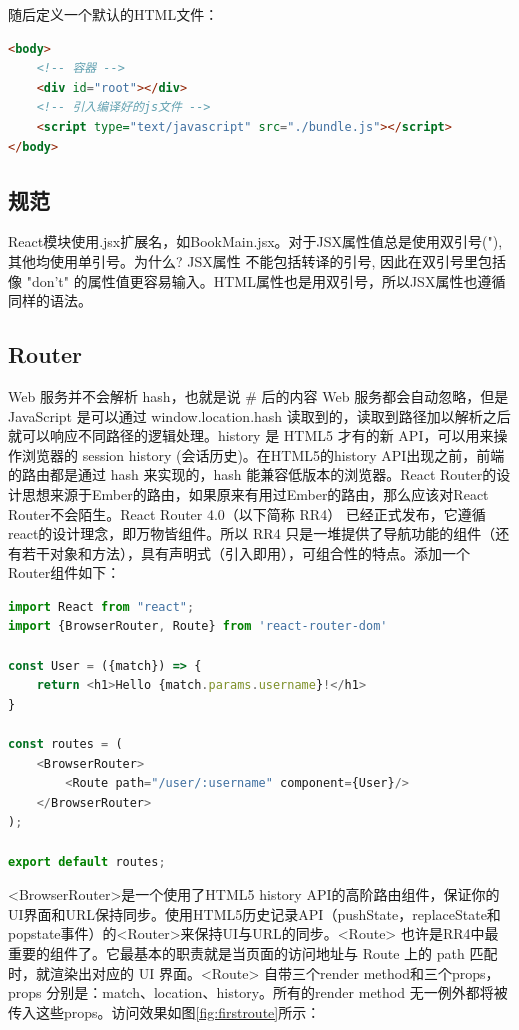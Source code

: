 \documentclass[letter]{book}
\begin{document}
随后定义一个默认的HTML文件：

\begin{lstlisting}[language=HTML]
<body>
	<!-- 容器 -->
	<div id="root"></div>
	<!-- 引入编译好的js文件 -->
	<script type="text/javascript" src="./bundle.js"></script>
</body>
\end{lstlisting}

\subsection{规范}

React模块使用.jsx扩展名，如BookMain.jsx。对于JSX属性值总是使用双引号("), 其他均使用单引号。为什么? JSX属性 不能包括转译的引号, 因此在双引号里包括像 "don't" 的属性值更容易输入。HTML属性也是用双引号，所以JSX属性也遵循同样的语法。

\subsection{Router}

Web 服务并不会解析 hash，也就是说 \# 后的内容 Web 服务都会自动忽略，但是 JavaScript 是可以通过 window.location.hash 读取到的，读取到路径加以解析之后就可以响应不同路径的逻辑处理。history 是 HTML5 才有的新 API，可以用来操作浏览器的 session history (会话历史)。在HTML5的history API出现之前，前端的路由都是通过 hash 来实现的，hash 能兼容低版本的浏览器。React Router的设计思想来源于Ember的路由，如果原来有用过Ember的路由，那么应该对React Router不会陌生。React Router 4.0（以下简称 RR4） 已经正式发布，它遵循react的设计理念，即万物皆组件。所以 RR4 只是一堆提供了导航功能的组件（还有若干对象和方法），具有声明式（引入即用），可组合性的特点。添加一个Router组件如下：

\begin{lstlisting}[language=Javascript]
import React from "react";
import {BrowserRouter, Route} from 'react-router-dom'

const User = ({match}) => {
	return <h1>Hello {match.params.username}!</h1>
}

const routes = (
	<BrowserRouter>
		<Route path="/user/:username" component={User}/>
	</BrowserRouter>
);

export default routes;
\end{lstlisting}

<BrowserRouter>是一个使用了HTML5 history API的高阶路由组件，保证你的UI界面和URL保持同步。使用HTML5历史记录API（pushState，replaceState和popstate事件）的<Router>来保持UI与URL的同步。<Route> 也许是RR4中最重要的组件了。它最基本的职责就是当页面的访问地址与 Route 上的 path 匹配时，就渲染出对应的 UI 界面。<Route> 自带三个render method和三个props，props 分别是：match、location、history。所有的render method 无一例外都将被传入这些props。访问效果如图\ref{fig:firstroute}所示：
\end{document}
